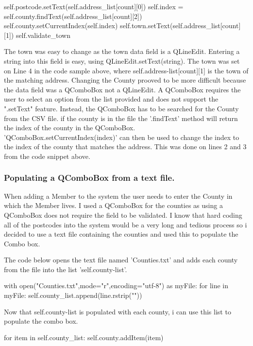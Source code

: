 \begin{python}
self.postcode.setText(self.address_list[count][0])
self.index = self.county.findText(self.address_list[count][2])
self.county.setCurrentIndex(self.index)
self.town.setText(self.address_list[count][1])
self.validate_town
\end{python}

The town was easy to change as the town data field is a QLineEdit. Entering a string into this field is easy, using QLineEdit.setText(string). The town was set on Line 4 in the code sample above, where self.address-list[count][1] is the town of the matching address. Changing the County prooved to be more difficult because the data field was a QComboBox not a QLineEdit. A QComboBox requires the user to select an option from the list provided and does not support the ".setText" feature. Instead, the QComboBox has to be searched for the County from the CSV file. if the county is in the file the '.findText' method will return the index of the county in the QComboBox. 'QComboBox.setCurrentIndex(index)' can then be used to change the index to the index of the county that matches the address. This was done on lines 2 and 3 from the code snippet above.

\subsubsection{Populating a QComboBox from a text file.}

When adding a Member to the system the user needs to enter the County in which the Member lives. I used a QComboBox for the counties as using a QComboBox does not require the field to be validated. I know that hard coding all of the postcodes into the system would be a very long and tedious process so i decided to use a text file containing the counties and used this to populate the Combo box.

The code below opens the text file named 'Counties.txt' and adds each county from the file into the list 'self.county-list'.

\begin{python}
with open("Counties.txt",mode="r",encoding="utf-8") as myFile:
                    for line in myFile:
                        self.county_list.append(line.rstrip("\n"))
\end{python}

Now that self.county-list is populated with each county, i can use this list to populate the combo box.

\begin{python}
for item in self.county_list:
                        self.county.addItem(item)
\end{python}

